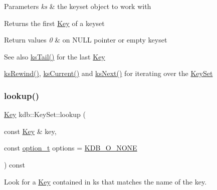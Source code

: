 \begin{DoxyParams}{Parameters}
{\em ks} & the keyset object to work with \\
\hline
\end{DoxyParams}
\begin{DoxyReturn}{Returns}
the first \hyperlink{classkdb_1_1Key}{Key} of a keyset 
\end{DoxyReturn}

\begin{DoxyRetVals}{Return values}
{\em 0} & on N\+U\+LL pointer or empty keyset \\
\hline
\end{DoxyRetVals}
\begin{DoxySeeAlso}{See also}
\hyperlink{group__keyset_gadca442c4ab43cf532b15091d7711559e}{ks\+Tail()} for the last \hyperlink{group__key}{Key} 

\hyperlink{group__keyset_gabe793ff51f1728e3429c84a8a9086b70}{ks\+Rewind()}, \hyperlink{group__keyset_ga4287b9416912c5f2ab9c195cb74fb094}{ks\+Current()} and \hyperlink{group__keyset_ga317321c9065b5a4b3e33fe1c399bcec9}{ks\+Next()} for iterating over the \hyperlink{group__keyset}{Key\+Set} 
\end{DoxySeeAlso}
\mbox{\label{classkdb_1_1KeySet_a78125fb19c6aebb0d8fc1a7238b78ace}} 
\subsubsection{\texorpdfstring{lookup()}{lookup()}\hspace{0.1cm}{\footnotesize\ttfamily [1/2]}}
{\footnotesize\ttfamily \hyperlink{classkdb_1_1Key}{Key} kdb\+::\+Key\+Set\+::lookup (\begin{DoxyParamCaption}\item[{const \hyperlink{classkdb_1_1Key}{Key} \&}]{key,  }\item[{const \hyperlink{group__keyset_ga98a3d6a4016c9dad9cbd1a99a9c2a45a}{option\+\_\+t}}]{options = {\ttfamily \hyperlink{group__keyset_gga98a3d6a4016c9dad9cbd1a99a9c2a45aa00738455e0ae843c8720809d8287f370}{K\+D\+B\+\_\+\+O\+\_\+\+N\+O\+NE}} }\end{DoxyParamCaption}) const\hspace{0.3cm}{\ttfamily [inline]}}



Look for a \hyperlink{classkdb_1_1Key}{Key} contained in {\ttfamily ks} that matches the name of the {\ttfamily key}. 

